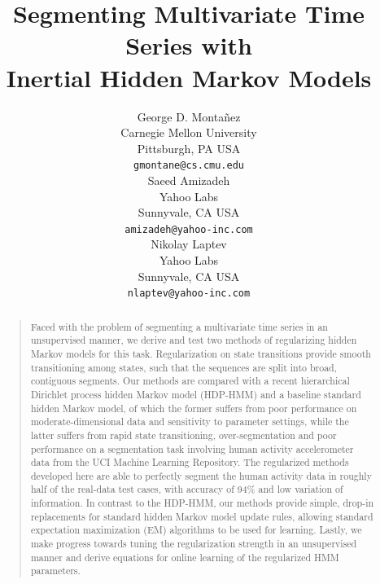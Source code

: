 \documentclass[letterpaper]{article}
\begin{document}
\title{Segmenting Multivariate Time Series with\\Inertial Hidden Markov Models}

\author{
George D. Monta\~nez \\
Carnegie Mellon University\\
Pittsburgh, PA USA\\
\texttt{gmontane@cs.cmu.edu} \\
\And    
Saeed Amizadeh\\
Yahoo Labs\\
Sunnyvale, CA USA\\
\texttt{amizadeh@yahoo-inc.com} \\
\And
Nikolay Laptev \\
Yahoo Labs\\
Sunnyvale, CA USA\\
\texttt{nlaptev@yahoo-inc.com} \\
}

\maketitle

\begin{abstract}
\begin{quote}
    Faced with the problem of segmenting a multivariate time series in an unsupervised manner, we derive and test two methods of regularizing hidden Markov models for this task. Regularization on state transitions provide smooth transitioning among states, such that the sequences are split into broad, contiguous segments. Our methods are compared with a recent hierarchical Dirichlet process hidden Markov model (HDP-HMM) and a baseline standard hidden Markov model, of which the former suffers from poor performance on moderate-dimensional data and sensitivity to parameter settings, while the latter suffers from rapid state transitioning, over-segmentation and poor performance on a segmentation task involving human activity accelerometer data from the UCI Machine Learning Repository. The regularized methods developed here are able to perfectly segment the human activity data in roughly half of the real-data test cases, with accuracy of 94\% and low variation of information. In contrast to the HDP-HMM, our methods provide simple, drop-in replacements for standard hidden Markov model update rules, allowing standard expectation maximization (EM) algorithms to be used for learning. Lastly, we make progress towards tuning the regularization strength in an unsupervised manner and derive equations for online learning of the regularized HMM parameters.
\end{quote}
\end{abstract}
\end{document}
